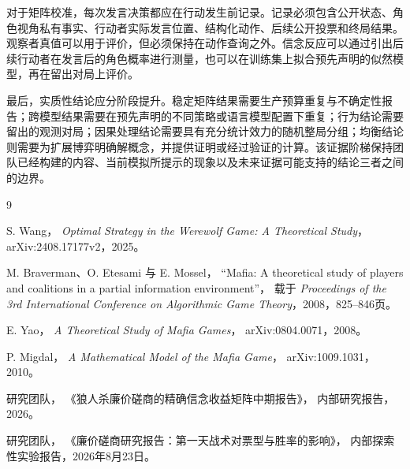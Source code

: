 \documentclass[UTF8,11pt,a4paper,fontset=windows]{ctexart}
\begin{document}
对于矩阵校准，每次发言决策都应在行动发生前记录。记录必须包含公开状态、角色视角私有事实、行动者实际发言位置、结构化动作、后续公开投票和终局结果。观察者真值可以用于评价，但必须保持在动作查询之外。信念反应可以通过引出后续行动者在发言后的角色概率进行测量，也可以在训练集上拟合预先声明的似然模型，再在留出对局上评价。

最后，实质性结论应分阶段提升。稳定矩阵结果需要生产预算重复与不确定性报告；跨模型结果需要在预先声明的不同策略或语言模型配置下重复；行为结论需要留出的观测对局；因果处理结论需要具有充分统计效力的随机整局分组；均衡结论则需要为扩展博弈明确解概念，并提供证明或经过验证的计算。该证据阶梯保持团队已经构建的内容、当前模拟所提示的现象以及未来证据可能支持的结论三者之间的边界。

\begin{thebibliography}{9}

S. Wang，
\emph{Optimal Strategy in the Werewolf Game: A Theoretical Study}，
arXiv:2408.17177v2，2025。

M. Braverman、O. Etesami 与 E. Mossel，
“Mafia: A theoretical study of players and coalitions in a partial information environment”，
载于 \emph{Proceedings of the 3rd International Conference on Algorithmic Game Theory}，2008，825--846页。

E. Yao，
\emph{A Theoretical Study of Mafia Games}，
arXiv:0804.0071，2008。

P. Migdal，
\emph{A Mathematical Model of the Mafia Game}，
arXiv:1009.1031，2010。

研究团队，
《狼人杀廉价磋商的精确信念收益矩阵中期报告》，
内部研究报告，2026。

研究团队，
《廉价磋商研究报告：第一天战术对票型与胜率的影响》，
内部探索性实验报告，2026年8月23日。

\end{thebibliography}
\end{document}
